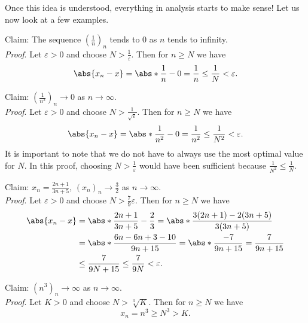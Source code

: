 \documentclass[../real_analysis.tex]{subfiles}
\begin{document}
        Once this idea is understood, everything in analysis starts to make sense! Let us now look at a few examples.
        \begin{example}
            Claim: The sequence $\left(\frac{1}{n}\right)_n$ tends to 0 as $n$ tends to infinity.\\
            \textit{Proof}. Let $\varepsilon>0$ and choose $N>\frac{1}{\varepsilon}$. Then for $n\geq N$ we have
            \begin{equation}
                \abs{x_n-x}=\abs*{\frac{1}{n}-0}=\frac{1}{n}\leq\frac{1}{N}<\varepsilon.
            \end{equation}
        \end{example}
        \begin{example}
            Claim: $\left(\frac{1}{n^2}\right)_n\to0$ as $n\to\infty$.\\
            \textit{Proof}. Let $\varepsilon>0$ and choose $N>\frac{1}{\sqrt{\varepsilon}}$. Then for $n\geq N$ we have
            \begin{equation}
                \abs{x_n-x}=\abs*{\frac{1}{n^2}-0}=\frac{1}{n^2}\leq\frac{1}{N^2}<\varepsilon.
            \end{equation}
            It is important to note that we do not have to always use the most optimal value for $N$. In this proof, choosing $N>\frac{1}{\varepsilon}$ would have been sufficient because $\frac{1}{N^2}\leq\frac{1}{N}$.
        \end{example}
        \begin{example}
            Claim: $x_n=\frac{2n+1}{3n+5}$, $(x_n)_n\to\frac{3}{2}$ as $n\to\infty$.\\
            \textit{Proof}. Let $\varepsilon>0$ and choose $N>\frac{7}{9}\varepsilon$. Then for $n\geq N$ we have
            \begin{align}
                \abs{x_n-x}&=\abs*{\frac{2n+1}{3n+5}-\frac{2}{3}}=\abs*{\frac{3(2n+1)-2(3n+5)}{3(3n+5)}}\\
                &=\abs*{\frac{6n-6n+3-10}{9n+15}}=\abs*{\frac{-7}{9n+15}}=\frac{7}{9n+15}\\
                &\leq\frac{7}{9N+15}\leq\frac{7}{9N}<\varepsilon.
            \end{align}
        \end{example}
        \begin{example}
            Claim: $(n^3)_n\to\infty$ as $n\to\infty$.\\
            \textit{Proof}. Let $K>0$ and choose $N>\sqrt[3]{K}$. Then for $n\geq N$ we have
            \begin{equation}
                x_n=n^3\geq N^3>K.
            \end{equation}
        \end{example}
\end{document}

